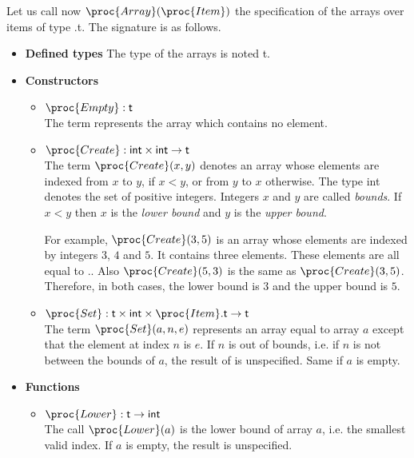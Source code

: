 \documentclass[11pt,a4paper]{article}
\newcommand\type[1]{\textsf{#1}}
\begin{document}
\noindent Let us call now \(\proc{Array}(\proc{Item})\) the
specification of the arrays over items of type
.\type{t}. The signature is as follows.
\begin{itemize}

  \item \textbf{Defined types}
  The type of the arrays is noted \type{t}.

  \item \textbf{Constructors}
  \begin{itemize}

    \item \(\proc{Empty} : \type{t}\)\\
    The term  represents the array which contains no
    element.

    \item \(\proc{Create} : \type{int} \times \type{int} \rightarrow
    \type{t}\)\\
    The term \(\proc{Create} (x, y)\) denotes an array whose
    elements are indexed from \(x\) to \(y\), if \(x < y\),
    or from \(y\) to \(x\) otherwise. The type \type{int} denotes
    the set of positive integers. Integers \(x\) and \(y\) are
    called \emph{bounds}. If \(x < y\) then \(x\) is the
    \emph{lower bound} and \(y\) is the \emph{upper bound}.

    For example, \(\proc{Create}(3, 5)\) is an array whose elements
    are indexed by integers \(3\), \(4\) and \(5\). It contains three
    elements. These elements are all equal to
    .. Also \(\proc{Create} (5, 3)\) is the
    same as \(\proc{Create} (3, 5)\).  Therefore, in both cases, the
    lower bound is \(3\) and the upper bound is \(5\).

    \item \(\proc{Set} : \type{t} \times \type{int} \times
    \proc{Item}.\type{t} \rightarrow \type{t}\)\\
    The term \(\proc{Set} (a, n, e)\) represents an
    array equal to array \(a\) except that the element at index
    \(n\) is \(e\). If \(n\) is out of bounds, i.e. if \(n\) is
    not between the bounds of \(a\), the result of  is
    unspecified. Same if \(a\) is empty.

  \end{itemize}

  \item \textbf{Functions}
  \begin{itemize}

    \item \(\proc{Lower} : \type{t} \rightarrow \type{int}\)\\
    The call \(\proc{Lower} (a)\) is the lower bound of array
    \(a\), i.e. the smallest valid index. If \(a\) is empty, the
    result is unspecified.


\end{itemize}
\end{itemize}
\end{document}
